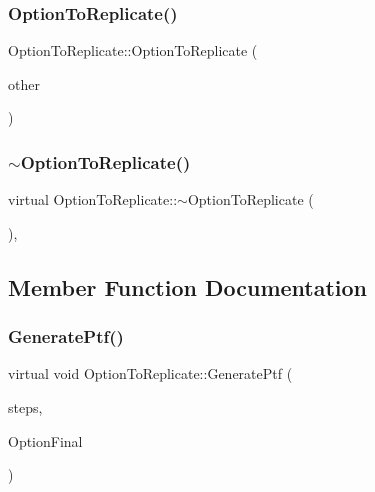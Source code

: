 \hypertarget{classOptionToReplicate_a94d108f85fbd72b41d68f5e22061d0c5}{}\label{classOptionToReplicate_a94d108f85fbd72b41d68f5e22061d0c5} 
\subsubsection{\texorpdfstring{Option\+To\+Replicate()}{OptionToReplicate()}\hspace{0.1cm}{\footnotesize\ttfamily [2/2]}}
{\footnotesize\ttfamily Option\+To\+Replicate\+::\+Option\+To\+Replicate (\begin{DoxyParamCaption}\item[{const \hyperlink{classOptionToReplicate}{Option\+To\+Replicate} \&}]{other }\end{DoxyParamCaption})}

\hypertarget{classOptionToReplicate_a215ec3a4ce1dd20524ee87c663e8ed74}{}\label{classOptionToReplicate_a215ec3a4ce1dd20524ee87c663e8ed74} 
\subsubsection{\texorpdfstring{$\sim$\+Option\+To\+Replicate()}{~OptionToReplicate()}}
{\footnotesize\ttfamily virtual Option\+To\+Replicate\+::$\sim$\+Option\+To\+Replicate (\begin{DoxyParamCaption}{ }\end{DoxyParamCaption})\hspace{0.3cm}{\ttfamily [inline]}, {\ttfamily [virtual]}}



\subsection{Member Function Documentation}
\hypertarget{classOptionToReplicate_ae744ce948286546566cd424eaa7ea5cb}{}\label{classOptionToReplicate_ae744ce948286546566cd424eaa7ea5cb} 
\subsubsection{\texorpdfstring{Generate\+Ptf()}{GeneratePtf()}\hspace{0.1cm}{\footnotesize\ttfamily [1/2]}}
{\footnotesize\ttfamily virtual void Option\+To\+Replicate\+::\+Generate\+Ptf (\begin{DoxyParamCaption}\item[{unsigned long}]{steps,  }\item[{shared\+\_\+ptr$<$ Option $>$}]{Option\+Final }\end{DoxyParamCaption})\hspace{0.3cm}{\ttfamily [pure virtual]}}



